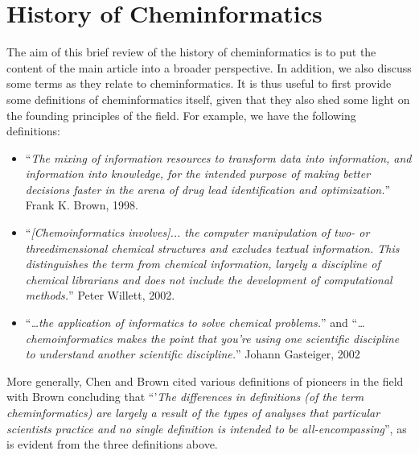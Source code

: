 \documentclass{sig-alternate}
\begin{document}
\section{History of Cheminformatics}
The aim of this brief review of the history of cheminformatics is to
put the content of the main article into a broader perspective. In
addition, we also discuss some terms as they relate to
cheminformatics.  It is thus useful to first provide some definitions
of cheminformatics itself, given that they also shed some light on the
founding principles of the field. For example, we have the following
definitions:
\begin{itemize}
\item ``\textit{The mixing of information resources to transform data
    into information, and information into knowledge, for the intended
    purpose of making better decisions faster in the arena of drug
    lead identification and optimization.}'' Frank K. Brown, 1998.
\item ``\textit{[Chemoinformatics involves]... the computer
    manipulation of two- or threedimensional chemical structures and
    excludes textual information. This distinguishes the term from
    chemical information, largely a discipline of chemical librarians
    and does not include the development of computational methods.}''
  Peter Willett, 2002.
\item ``\textit{\ldots the application of informatics to solve chemical
    problems.}'' and ``\textit{\ldots chemoinformatics makes the point that
    you're using one scientific discipline to understand another
    scientific discipline.}'' Johann Gasteiger, 2002
\end{itemize}
More generally, Chen\cite{Chen2006} and Brown \cite{brown2009} cited various
definitions of pioneers in the field with Brown concluding that
``'\textit{The differences in definitions (of the term
  cheminformatics) are largely a result of the types of analyses that
  particular scientists practice and no single definition is intended
  to be all-encompassing}'', as is evident from the three definitions above. 
\end{document}
